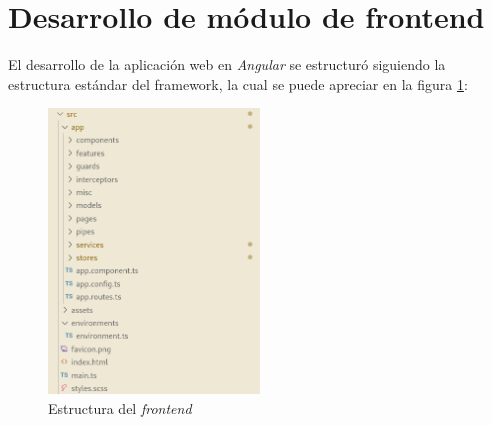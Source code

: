 \section{Desarrollo de módulo de frontend}

El desarrollo de la aplicación web en \textit{Angular} se estructuró siguiendo la estructura estándar del framework\citep{ANGULAR:4}, la cual se puede apreciar en la figura \ref{frontend:folder}:

\begin{figure}[H]
	\centering
	\includegraphics[width=0.5\textwidth]{./Figures/frontend-folder.png}
	\caption{Estructura del \textit{frontend}}
	\label{frontend:folder}
\end{figure}

